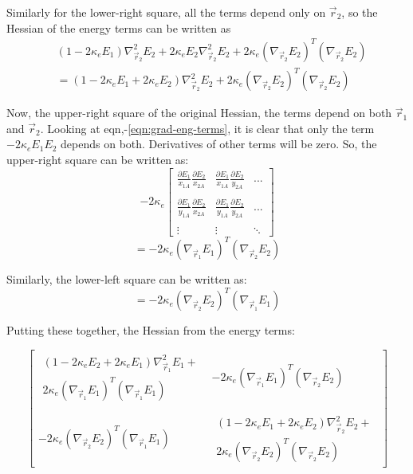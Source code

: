 \documentclass[10pt]{article}
\begin{document}
Similarly for the lower-right square, all the terms depend only on $\vec{r}_2$, so the Hessian of the energy terms can be written as
\begin{equation}
	\begin{split}
		& (1-2\kappa_e E_1)\nabla_{\vec{r}_2}^2E_2 + 2\kappa_e E_2\nabla^2_{\vec{r}_2}E_2 + 2\kappa_e(\nabla_{\vec{r}_2}E_2)^T(\nabla_{\vec{r}_2}E_2) \\
		& = (1-2\kappa_e E_1+2\kappa_e E_2)\nabla_{\vec{r}_2}^2E_2 + 2\kappa_e(\nabla_{\vec{r}_2}E_2)^T(\nabla_{\vec{r}_2}E_2)
	\end{split}
\end{equation}

Now, the upper-right square of the original Hessian, the terms depend on both $\vec{r}_1$ and $\vec{r}_2$. Looking at eqn,-\eqref{eqn:grad-eng-terms}, it is clear that only the term $-2\kappa_e E_1 E_2$ depends on both. Derivatives of other terms will be zero. So, the upper-right square can be written as:
$$-2 \kappa_e \begin{bmatrix}
	\frac{\partial E_1}{x_{1A}}\frac{\partial E_2}{x_{2A}} & \frac{\partial E_1}{x_{1A}}\frac{\partial E_2}{y_{2A}} & ... \\ \\
	\frac{\partial E_1}{y_{1A}}\frac{\partial E_2}{x_{2A}} & \frac{\partial E_1}{y_{1A}}\frac{\partial E_2}{y_{2A}} & ... \\ \\
	\vdots & \vdots & \ddots
\end{bmatrix}$$
$$= -2 \kappa_e (\nabla_{\vec{r}_1}E_1)^T (\nabla_{\vec{r}_2}E_2)$$

Similarly, the lower-left square can be written as:
$$= -2 \kappa_e (\nabla_{\vec{r}_2}E_2)^T (\nabla_{\vec{r}_1}E_1)$$

Putting these together, the Hessian from the energy terms:

$$
\begin{bmatrix}
	\begin{matrix}
		(1-2\kappa_e E_2+2\kappa_e E_1)\nabla_{\vec{r}_1}^2E_1 + \\ 2\kappa_e(\nabla_{\vec{r}_1}E_1)^T(\nabla_{\vec{r}_1}E_1) 
	\end{matrix}
	& -2 \kappa_e (\nabla_{\vec{r}_1}E_1)^T (\nabla_{\vec{r}_2}E_2) \\ \\
	 -2 \kappa_e (\nabla_{\vec{r}_2}E_2)^T (\nabla_{\vec{r}_1}E_1) & 
	\begin{matrix}
		(1-2\kappa_e E_1+2\kappa_e E_2)\nabla_{\vec{r}_2}^2E_2 + \\ 2\kappa_e(\nabla_{\vec{r}_2}E_2)^T(\nabla_{\vec{r}_2}E_2)
	\end{matrix}
\end{bmatrix}
$$
\end{document}
